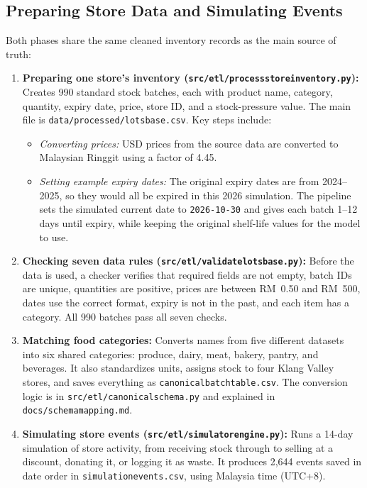 \documentclass[12pt,a4paper]{article}
\renewcommand{\_}{\oldunderscore\allowbreak}
\begin{document}
\subsection{Preparing Store Data and Simulating Events}
Both phases share the same cleaned inventory records as the main source of truth:

\begin{enumerate}[leftmargin=18pt, itemsep=3pt]
    \item \textbf{Preparing one store's inventory (\texttt{src/etl/process\_store\_inventory.py}):} Creates 990 standard stock batches, each with product name, category, quantity, expiry date, price, store ID, and a stock-pressure value. The main file is \texttt{data/processed/lots\_base.csv}. Key steps include:
    \begin{itemize}[leftmargin=14pt, itemsep=1pt]
        \item \emph{Converting prices:} USD prices from the source data are converted to Malaysian Ringgit using a factor of 4.45.
        \item \emph{Setting example expiry dates:} The original expiry dates are from 2024--2025, so they would all be expired in this 2026 simulation. The pipeline sets the simulated current date to \texttt{2026-10-30} and gives each batch 1--12 days until expiry, while keeping the original shelf-life values for the model to use.
    \end{itemize}
    \item \textbf{Checking seven data rules (\texttt{src/etl/validate\_lots\_base.py}):} Before the data is used, a checker verifies that required fields are not empty, batch IDs are unique, quantities are positive, prices are between RM~0.50 and RM~500, dates use the correct format, expiry is not in the past, and each item has a category. All 990 batches pass all seven checks.
    \item \textbf{Matching food categories:} Converts names from five different datasets into six shared categories: produce, dairy, meat, bakery, pantry, and beverages. It also standardizes units, assigns stock to four Klang Valley stores, and saves everything as \texttt{canonical\_batch\_table.csv}. The conversion logic is in \texttt{src/etl/canonical\_schema.py} and explained in \texttt{docs/schema\_mapping.md}.
    \item \textbf{Simulating store events (\texttt{src/etl/simulator\_engine.py}):} Runs a 14-day simulation of store activity, from receiving stock through to selling at a discount, donating it, or logging it as waste. It produces 2,644 events saved in date order in \texttt{simulation\_events.csv}, using Malaysia time (UTC+8).
\end{enumerate}
\end{document}
